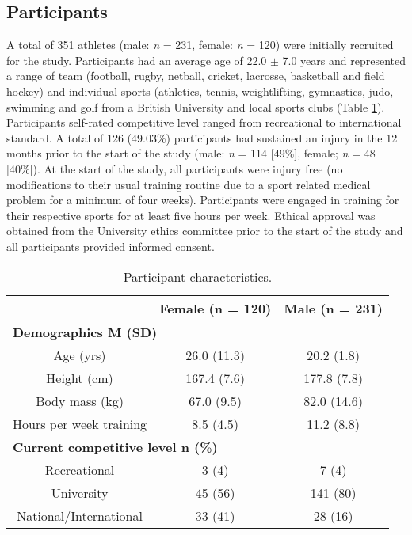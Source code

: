 \documentclass[utf8]{frontiersHLTH}
\begin{document}
\hypertarget{participants}{%
\subsection*{Participants}\label{participants}}

A total of 351 athletes (male: \emph{n} = 231, female: \emph{n} = 120)
were initially recruited for the study. Participants had an average age
of 22.0 \(\pm\) 7.0 years and represented a range of team (football,
rugby, netball, cricket, lacrosse, basketball and field hockey) and
individual sports (athletics, tennis, weightlifting, gymnastics, judo,
swimming and golf from a British University and local sports clubs
(Table \ref{tab:table1}). Participants self-rated competitive level
ranged from recreational to international standard. A total of 126
(49.03\%) participants had sustained an injury in the 12 months prior to
the start of the study (male: \emph{n} = 114 {[}49\%{]}, female;
\emph{n} = 48 {[}40\%{]}). At the start of the study, all participants
were injury free (no modifications to their usual training routine due
to a sport related medical problem for a minimum of four weeks).
Participants were engaged in training for their respective sports for at
least five hours per week. Ethical approval was obtained from the
University ethics committee prior to the start of the study and all
participants provided informed consent.

\begin{table}[H]

\caption{\label{tab:table1}Participant characteristics.}
\centering
\begin{tabular}[t]{c|c|c}
\hline
\textbf{ } & \textbf{Female (n = 120)} & \textbf{Male (n = 231)}\\
\hline
\multicolumn{3}{l}{\textbf{Demographics M (SD)}}\\
\hline
\hspace{1em}Age (yrs) & 26.0 (11.3) & 20.2 (1.8)\\
\hline
\hspace{1em}Height (cm) & 167.4 (7.6) & 177.8 (7.8)\\
\hline
\hspace{1em}Body mass (kg) & 67.0 (9.5) & 82.0 (14.6)\\
\hline
\hspace{1em}Hours per week training & 8.5 (4.5) & 11.2 (8.8)\\
\hline
\multicolumn{3}{l}{\textbf{Current competitive level n (\%)}}\\
\hline
\hspace{1em}Recreational & 3 (4) & 7 (4)\\
\hline
\hspace{1em}University & 45 (56) & 141 (80)\\
\hline
\hspace{1em}National/International & 33 (41) & 28 (16)\\
\hline
\end{tabular}
\end{table}
\end{document}
